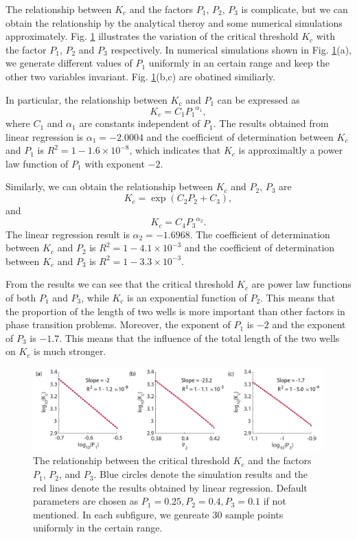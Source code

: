 \documentclass[a4paper,11pt]{article}
\begin{document}
The relationship between $K_c$ and the factors $P_1$, $P_2$, $P_3$ is complicate, but we can obtain the relationship by the analytical theroy and some numerical simulations approximately. Fig. \ref{fig6} illustrates the variation of the critical threshold $K_c$ with the factor $P_1$, $P_2$ and $P_3$ respectively. In numerical simulations shown in Fig. \ref{fig6}(a), we generate different values of $P_1$ uniformly in an certain range and keep the other two variables invariant. Fig. \ref{fig6}(b,c) are obatined similiarly.

In particular, the relationship between $K_c$ and $P_1$ can be expressed as
\begin{equation}
K_c = C_1 {P_1}^{\alpha_1},
\end{equation}
where $C_1$ and $\alpha_1$ are constants independent of $P_1$. The results obtained from linear regression is $\alpha_1 = -2.0004$ and the coefficient of determination between $K_c$ and $P_1$ is $R^2 = 1 - 1.6 \times 10^{-8}$, which indicates that $K_c$ is approximaltly a power law function of $P_1$ with exponent $-2$.

Similarly, we can obtain the relationship between $K_c$ and $P_2$, $P_3$ are
\begin{equation}
K_c = \exp(C_2 P_2 + C_3),
\end{equation}
and
\begin{equation}
K_c = C_4 {P_3}^{\alpha_2}.
\end{equation}
The linear regression result is $\alpha_2 = -1.6968$. The coefficient of determination between $K_c$ and $P_2$ is $R^2 = 1 - 4.1 \times 10^{-3}$ and the coefficient of determination between $K_c$ and $P_3$ is $R^2 = 1 - 3.3 \times 10^{-3}$.

From the results we can see that the critical threshold $K_c$ are power law functions of both $P_1$ and $P_3$, while $K_c$ is an exponential function of $P_2$. This means that the proportion of the length of two wells is more important than other factors in phase transition problems. Moreover, the exponent of $P_1$ is $-2$ and the exponent of $P_3$ is $-1.7$. This means that the influence of the total length of the two wells on $K_c$ is much stronger.

\begin{figure}
\centering
\includegraphics[width=\linewidth]{Fig6}
\caption{The relationship between the critical threshold $K_c$ and the factors $P_1$, $P_2$, and $P_3$. Blue circles denote the simulation results and the red lines denote the results obtained by linear regression. Default parameters are chosen as $P_1 = 0.25, P_2 = 0.4, P_3 = 0.1$ if not mentioned. In each subfigure, we genreate $30$ sample points uniformly in the certain range.}
\label{fig6}
\end{figure}
\end{document}
